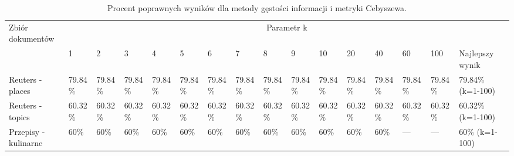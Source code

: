 \documentclass{classrep}
\begin{document}
\begingroup
{\scriptsize  
\setlength{\LTleft}{-20cm plus -1fill}
\setlength{\LTright}{\LTleft}

\begin{longtable}{|p{1cm}|p{0.7cm}|p{0.7cm}|p{0.7cm}|p{0.7cm}|p{0.7cm}|p{0.7cm}|p{0.7cm}|p{0.7cm}|p{0.7cm}|p{0.7cm}|p{0.7cm}|p{0.7cm}|p{0.7cm}|p{0.7cm}|p{1.1cm}|}
\caption{ Procent poprawnych wyników dla metody gęstości informacji i metryki Cebyszewa.}\\ 
\hline

Zbiór
dokumentów

 &\multicolumn{15}{c|}{Parametr k}\\
\cline{2-16}
& 1
& 2
& 3
& 4
& 5
& 6
& 7
& 8
& 9
& 10
& 20
& 40
& 60
& 100
& Najlepszy wynik
\\ \hline\hline
Reuters
- places
& 79.84\%	%
& 79.84\%	%
& 79.84\%	%
& 79.84\%	%
& 79.84\%	%
& 79.84\%	%
& 79.84\%	%
& 79.84\%	%
& 79.84\%	%
& 79.84\%	%
& 79.84\%	%
& 79.84\%	%
& 79.84\%	%
& 79.84\%	%
& 79.84\% (k=1-100)
\\ \hline
Reuters
- topics
& 60.32\%	%
& 60.32\%	%
& 60.32\%	%
& 60.32\%	%
& 60.32\%	%
& 60.32\%	%
& 60.32\%	%
& 60.32\%	%
& 60.32\%	%
& 60.32\%	%
& 60.32\%	%
& 60.32\%	%
& 60.32\%	%
& 60.32\%	%
& 60.32\% (k=1-100)
\\ \hline
Przepisy
- kulinarne 
& 60\%	%
& 60\%	%
& 60\%		%
& 60\%	%
& 60\%	%
& 60\%		%
& 60\%		%
& 60\%	%
& 60\%	%
& 60\%		%
& 60\%		%
& 60\%		%
& ---		%
& ---		%
& 60\% (k=1-100)
\\ \hline
\end{longtable}
}
\endgroup



\end{document}

